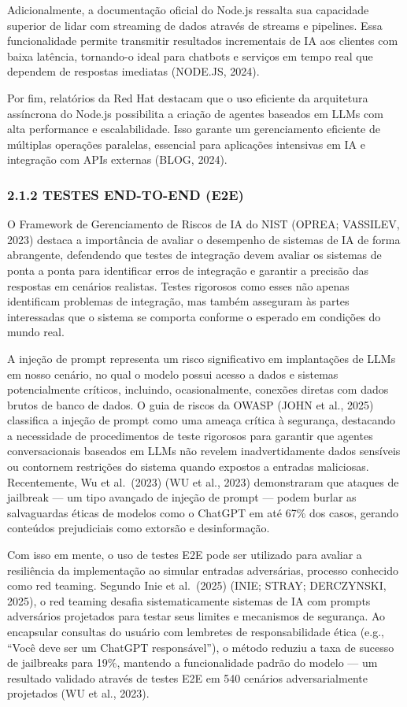 \documentclass[
]{article}
\begin{document}
Adicionalmente, a documentação oficial do Node.js ressalta sua
capacidade superior de lidar com streaming de dados através de streams e
pipelines. Essa funcionalidade permite transmitir resultados
incrementais de IA aos clientes com baixa latência, tornando-o ideal
para chatbots e serviços em tempo real que dependem de respostas
imediatas (NODE.JS, 2024).

Por fim, relatórios da Red Hat destacam que o uso eficiente da
arquitetura assíncrona do Node.js possibilita a criação de agentes
baseados em LLMs com alta performance e escalabilidade. Isso garante um
gerenciamento eficiente de múltiplas operações paralelas, essencial para
aplicações intensivas em IA e integração com APIs externas (BLOG, 2024).

\subsubsection{2.1.2 TESTES END-TO-END
(E2E)}\label{testes-end-to-end-e2e}

O Framework de Gerenciamento de Riscos de IA do NIST (OPREA; VASSILEV,
2023) destaca a importância de avaliar o desempenho de sistemas de IA de
forma abrangente, defendendo que testes de integração devem avaliar os
sistemas de ponta a ponta para identificar erros de integração e
garantir a precisão das respostas em cenários realistas. Testes
rigorosos como esses não apenas identificam problemas de integração, mas
também asseguram às partes interessadas que o sistema se comporta
conforme o esperado em condições do mundo real.

A injeção de prompt representa um risco significativo em implantações de
LLMs em nosso cenário, no qual o modelo possui acesso a dados e sistemas
potencialmente críticos, incluindo, ocasionalmente, conexões diretas com
dados brutos de banco de dados. O guia de riscos da OWASP (JOHN et al.,
2025) classifica a injeção de prompt como uma ameaça crítica à
segurança, destacando a necessidade de procedimentos de teste rigorosos
para garantir que agentes conversacionais baseados em LLMs não revelem
inadvertidamente dados sensíveis ou contornem restrições do sistema
quando expostos a entradas maliciosas. Recentemente, Wu et al.~(2023)
(WU et al., 2023) demonstraram que ataques de jailbreak --- um tipo
avançado de injeção de prompt --- podem burlar as salvaguardas éticas de
modelos como o ChatGPT em até 67\% dos casos, gerando conteúdos
prejudiciais como extorsão e desinformação.

Com isso em mente, o uso de testes E2E pode ser utilizado para avaliar a
resiliência da implementação ao simular entradas adversárias, processo
conhecido como red teaming. Segundo Inie et al.~(2025) (INIE; STRAY;
DERCZYNSKI, 2025), o red teaming desafia sistematicamente sistemas de IA
com prompts adversários projetados para testar seus limites e mecanismos
de segurança. Ao encapsular consultas do usuário com lembretes de
responsabilidade ética (e.g., ``Você deve ser um ChatGPT responsável''),
o método reduziu a taxa de sucesso de jailbreaks para 19\%, mantendo a
funcionalidade padrão do modelo --- um resultado validado através de
testes E2E em 540 cenários adversarialmente projetados (WU et al.,
2023).
\end{document}
